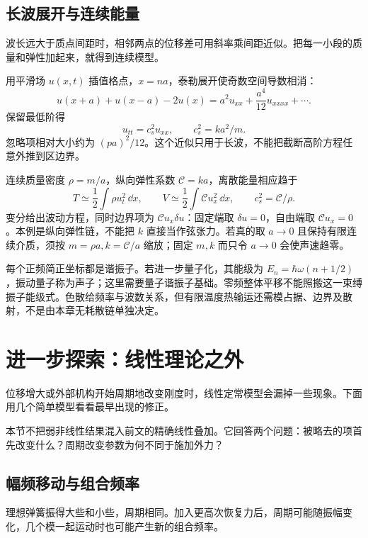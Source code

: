 \subsection{长波展开与连续能量}
波长远大于质点间距时，相邻两点的位移差可用斜率乘间距近似。把每一小段的质量和弹性加起来，就得到连续模型。

用平滑场 $u(x,t)$ 插值格点，$x=na$，泰勒展开使奇数空间导数相消：
\[
u(x+a)+u(x-a)-2u(x)
=a^2u_{xx}+\frac{a^4}{12}u_{xxxx}+\cdots.
\]
保留最低阶得
\begin{equation}
u_{tt}=c_s^2u_{xx},\qquad c_s^2=ka^2/m.
\label{eq:wave-equation}
\end{equation}
忽略项相对大小约为 $(pa)^2/12$。这个近似只用于长波，不能把截断高阶方程任意外推到区边界。

连续质量密度 $\rho=m/a$，纵向弹性系数 $\mathcal C=ka$，离散能量相应趋于
\[
T\simeq\frac12\int\rho u_t^2\,\dd x,\qquad
V\simeq\frac12\int\mathcal C u_x^2\,\dd x,\qquad
c_s^2=\mathcal C/\rho.
\]
变分给出波动方程，同时边界项为 $\mathcal C u_x\delta u$：固定端取 $\delta u=0$，自由端取 $\mathcal C u_x=0$。本例是纵向弹性链，不能把 $k$ 直接当作弦张力。若真的取 $a\to0$ 且保持有限连续介质，须按 $m=\rho a,k=\mathcal C/a$ 缩放；固定 $m,k$ 而只令 $a\to0$ 会使声速趋零。

\begin{modernbox}[title={进一步探索：声子与有限模态}]
每个正频简正坐标都是谐振子。若进一步量子化，其能级为 $E_n=\hbar\omega(n+1/2)$，振动量子称为声子；这里需要量子谐振子基础。零频整体平移不能照搬这一束缚振子能级式。色散给频率与波数关系，但有限温度热输运还需模占据、边界及散射，不是由本章无耗散链单独决定。
\end{modernbox}


\section{进一步探索：线性理论之外}
位移增大或外部机构开始周期地改变刚度时，线性定常模型会漏掉一些现象。下面用几个简单模型看看最早出现的修正。

本节不把弱非线性结果混入前文的精确线性叠加。它回答两个问题：被略去的项首先改变什么？周期改变参数为何不同于施加外力？

\subsection{幅频移动与组合频率}
理想弹簧振得大些和小些，周期相同。加入更高次恢复力后，周期可能随振幅变化，几个模一起运动时也可能产生新的组合频率。

